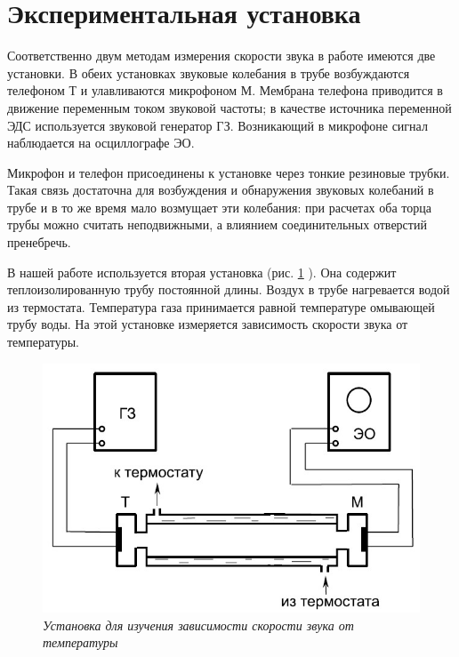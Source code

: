 \documentclass{article}
\begin{document}
\section*{Экспериментальная установка}

Соответственно двум методам измерения скорости звука в работе имеются две установки. В обеих установках звуковые колебания в трубе возбуждаются телефоном Т и улавливаются микрофоном М. Мембрана телефона приводится в движение переменным током звуковой частоты; в качестве источника переменной ЭДС используется звуковой генератор ГЗ. Возникающий в микрофоне сигнал наблюдается на осциллографе ЭО.

Микрофон и телефон присоединены к установке через тонкие резиновые трубки. Такая связь достаточна для возбуждения и обнаружения звуковых колебаний в трубе и в то же время мало возмущает эти колебания: при расчетах оба торца трубы можно считать неподвижными, а влиянием соединительных отверстий пренебречь.

В нашей работе используется вторая установка (рис. \ref{img2} ). Она содержит теплоизолированную трубу постоянной длины. Воздух в трубе нагревается водой из термостата. Температура газа принимается равной температуре омывающей трубу воды. На этой установке измеряется зависимость скорости звука от температуры.

\begin{figure}[h!]
	\begin{center}
		\includegraphics[width=12cm]{ust2.jpg}
	\end{center}
	\caption{\textit{Установка для изучения зависимости скорости звука от температуры}}
	\label{img2}
\end{figure}
\end{document}
